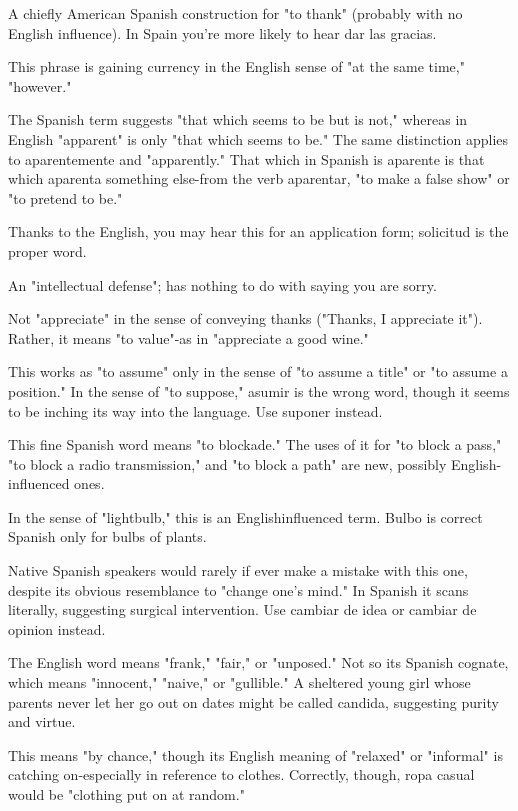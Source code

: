  A chiefly American Spanish construction for
"to thank" (probably with no English influence). In Spain you're more
likely to hear dar las gracias.

 This phrase is gaining currency in the English sense of "at the same time," "however."

 The Spanish term suggests "that which seems
to be but is not," whereas in English "apparent" is only "that which
seems to be." The same distinction applies to aparentemente and "apparently." That which in Spanish is aparente is that which aparenta
something else-from the verb aparentar, "to make a false show" or
"to pretend to be."

 Thanks to the English, you may hear this for an
application form; solicitud is the proper word.

 An "intellectual defense"; has nothing to do with
saying you are sorry.

 Not "appreciate" in the sense of conveying
thanks ("Thanks, I appreciate it"). Rather, it means "to value"-as
in "appreciate a good wine."

 This works as "to assume" only in the sense of "to
assume a title" or "to assume a position." In the sense of "to suppose,"
asumir is the wrong word, though it seems to be inching its way into
the language. Use suponer instead.

 This fine Spanish word means "to blockade."
The uses of it for "to block a pass," "to block a radio transmission,"
and "to block a path" are new, possibly English-influenced ones.

 In the sense of "lightbulb," this is an Englishinfluenced term. Bulbo is correct Spanish only for bulbs of plants.

 Native Spanish speakers would rarely if
ever make a mistake with this one, despite its obvious resemblance to
"change one's mind." In Spanish it scans literally, suggesting surgical
intervention. Use cambiar de idea or cambiar de opinion instead.

 The English word means "frank," "fair," or "unposed." Not so its Spanish cognate, which means "innocent," "naive,"
or "gullible." A sheltered young girl whose parents never let her go out
on dates might be called candida, suggesting purity and virtue.

 This means "by chance," though its English meaning of "relaxed" or "informal" is catching on-especially in reference
to clothes. Correctly, though, ropa casual would be "clothing put on at
random."

